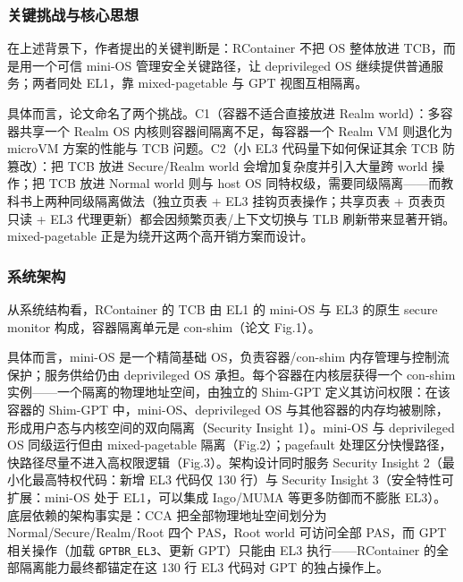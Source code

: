 \documentclass[11pt]{ctexart}
\begin{document}
\subsubsection{关键挑战与核心思想}
在上述背景下，作者提出的关键判断是：RContainer 不把 OS 整体放进 TCB，而是用一个可信 mini-OS 管理安全关键路径，让 deprivileged OS 继续提供普通服务；两者同处 EL1，靠 mixed-pagetable 与 GPT 视图互相隔离。\par
具体而言，论文命名了两个挑战。C1（容器不适合直接放进 Realm world）：多容器共享一个 Realm OS 内核则容器间隔离不足，每容器一个 Realm VM 则退化为 microVM 方案的性能与 TCB 问题。C2（小 EL3 代码量下如何保证其余 TCB 防篡改）：把 TCB 放进 Secure/Realm world 会增加复杂度并引入大量跨 world 操作；把 TCB 放进 Normal world 则与 host OS 同特权级，需要同级隔离——而教科书上两种同级隔离做法（独立页表 + EL3 挂钩页表操作；共享页表 + 页表页只读 + EL3 代理更新）都会因频繁页表/上下文切换与 TLB 刷新带来显著开销。mixed-pagetable 正是为绕开这两个高开销方案而设计。\par
\subsubsection{系统架构}
从系统结构看，RContainer 的 TCB 由 EL1 的 mini-OS 与 EL3 的原生 secure monitor 构成，容器隔离单元是 con-shim（论文 Fig.1）。\par
具体而言，mini-OS 是一个精简基础 OS，负责容器/con-shim 内存管理与控制流保护；服务供给仍由 deprivileged OS 承担。每个容器在内核层获得一个 con-shim 实例——一个隔离的物理地址空间，由独立的 Shim-GPT 定义其访问权限：在该容器的 Shim-GPT 中，mini-OS、deprivileged OS 与其他容器的内存均被剔除，形成用户态与内核空间的双向隔离（Security Insight 1）。mini-OS 与 deprivileged OS 同级运行但由 mixed-pagetable 隔离（Fig.2）；pagefault 处理区分快慢路径，快路径尽量不进入高权限逻辑（Fig.3）。架构设计同时服务 Security Insight 2（最小化最高特权代码：新增 EL3 代码仅 130 行）与 Security Insight 3（安全特性可扩展：mini-OS 处于 EL1，可以集成 Iago/MUMA 等更多防御而不膨胀 EL3）。底层依赖的架构事实是：CCA 把全部物理地址空间划分为 Normal/Secure/Realm/Root 四个 PAS，Root world 可访问全部 PAS，而 GPT 相关操作（加载 \texttt{GPTBR\_EL3}、更新 GPT）只能由 EL3 执行——RContainer 的全部隔离能力最终都锚定在这 130 行 EL3 代码对 GPT 的独占操作上。\par
\end{document}
